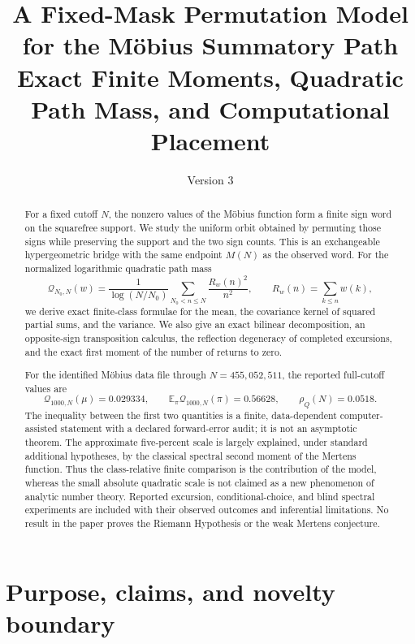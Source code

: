 \documentclass[11pt,reqno]{amsart}
\title[Fixed-Mask Permutations of the M\"obius Path]{A Fixed-Mask Permutation Model for the M\"obius Summatory Path\\
Exact Finite Moments, Quadratic Path Mass, and Computational Placement}
\author{}
\date{Version 3}
\numberwithin{equation}{section}
\theoremstyle{plain}
\theoremstyle{definition}
\theoremstyle{remark}
\newcommand{\E}{\mathbb E}
\newcommand{\QF}{\mathcal Q}
\begin{document}
\raggedbottom

\begin{abstract}
For a fixed cutoff \(N\), the nonzero values of the M\"obius function form a
finite sign word on the squarefree support.  We study the uniform orbit
obtained by permuting those signs while preserving the support and the two
sign counts.  This is an exchangeable hypergeometric bridge with the same
endpoint \(M(N)\) as the observed word.  For the normalized logarithmic
quadratic path mass
\begin{equation}
\QF_{N_0,N}(w)=\frac{1}{\log(N/N_0)}
\sum_{N_0<n\leq N}\frac{R_w(n)^2}{n^2},
\qquad R_w(n)=\sum_{k\leq n}w(k),
\label{eq:abstract-quadratic-mass}
\end{equation}
we derive exact finite-class formulae for the mean, the covariance kernel of
squared partial sums, and the variance.  We also give an exact bilinear
decomposition, an opposite-sign transposition calculus, the reflection
degeneracy of completed excursions, and the exact first moment of the number
of returns to zero.

For the identified M\"obius data file through \(N=455{,}052{,}511\), the
reported full-cutoff values are
\begin{equation}
\QF_{1000,N}(\mu)=0.029334,\qquad
\E_{\pi}\QF_{1000,N}(\pi)=0.56628,\qquad
\rho_Q(N)=0.0518.
\label{eq:abstract-full-cutoff}
\end{equation}
The inequality between the first two quantities is a finite, data-dependent
computer-assisted statement with a declared forward-error audit; it is not an
asymptotic theorem.  The approximate five-percent scale is largely explained,
under standard additional hypotheses, by the classical spectral second
moment of the Mertens function.  Thus the class-relative finite comparison is
the contribution of the model, whereas the small absolute quadratic scale is
not claimed as a new phenomenon of analytic number theory.  Reported
excursion, conditional-choice, and blind spectral experiments are included
with their observed outcomes and inferential limitations.  No result in the paper
proves the Riemann Hypothesis or the weak Mertens conjecture.
\end{abstract}

\maketitle
\tableofcontents
\bigskip

\section{Purpose, claims, and novelty boundary}
\label{sec:introduction}
\end{document}
